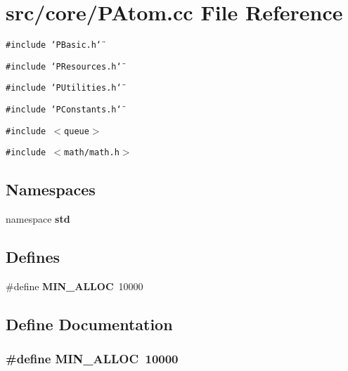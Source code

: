 \section{src/core/PAtom.cc File Reference}
\label{PAtom_8cc}


{\tt \#include \char`\"{}PBasic.h\char`\"{}}\par
{\tt \#include \char`\"{}PResources.h\char`\"{}}\par
{\tt \#include \char`\"{}PUtilities.h\char`\"{}}\par
{\tt \#include \char`\"{}PConstants.h\char`\"{}}\par
{\tt \#include $<$queue$>$}\par
{\tt \#include $<$math/math.h$>$}\par
\subsection*{Namespaces}
\begin{CompactItemize}
\item 
namespace {\bf std}
\end{CompactItemize}
\subsection*{Defines}
\begin{CompactItemize}
\item 
\#define {\bf MIN\_\-ALLOC}~10000
\end{CompactItemize}


\subsection{Define Documentation}
\subsubsection{\setlength{\rightskip}{0pt plus 5cm}\#define MIN\_\-ALLOC~10000}\label{PAtom_8cc_bebdf7cf9cffd35d807bdd26753d8c68}


